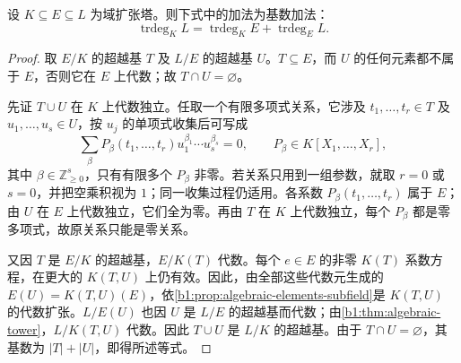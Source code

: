 \begin{proposition}[超越次数的塔式公式]\label{b1:prop:transcendence-tower}
	设 \(K\subseteq E\subseteq L\) 为域扩张塔。则下式中的加法为基数加法：
	\begin{equation}\label{b1:eq:transcendence-tower}
		\operatorname{trdeg}_K L=\operatorname{trdeg}_K E+\operatorname{trdeg}_E L.
	\end{equation}
\end{proposition}
\begin{proof}
	取 \(E/K\) 的超越基 \(T\) 及 \(L/E\) 的超越基 \(U\)。\(T\subseteq E\)，而 \(U\) 的任何元素都不属于 \(E\)，否则它在 \(E\) 上代数；故 \(T\cap U=\varnothing\)。

	先证 \(T\cup U\) 在 \(K\) 上代数独立。任取一个有限多项式关系，它涉及 \(t_1,\ldots,t_r\in T\) 及 \(u_1,\ldots,u_s\in U\)，按 \(u_j\) 的单项式收集后可写成
	\[
		\sum_{\beta}P_\beta(t_1,\ldots,t_r) u_1^{\beta_1}\cdots u_s^{\beta_s}=0, \qquad P_\beta\in K[X_1,\ldots,X_r],
	\]
	其中 \(\beta\in\mathbb Z_{\geq0}^s\)，只有有限多个 \(P_\beta\) 非零。若关系只用到一组参数，就取 \(r=0\) 或 \(s=0\)，并把空乘积视为 \(1\)；同一收集过程仍适用。各系数 \(P_\beta(t_1,\ldots,t_r)\) 属于 \(E\)；由 \(U\) 在 \(E\) 上代数独立，它们全为零。再由 \(T\) 在 \(K\) 上代数独立，每个 \(P_\beta\) 都是零多项式，故原关系只能是零关系。

	又因 \(T\) 是 \(E/K\) 的超越基，\(E/K(T)\) 代数。每个 \(e\in E\) 的非零 \(K(T)\) 系数方程，在更大的 \(K(T,U)\) 上仍有效。因此，由全部这些代数元生成的 \(E(U)=K(T,U)(E)\)，依\cref{b1:prop:algebraic-elements-subfield}是 \(K(T,U)\) 的代数扩张。\(L/E(U)\) 也因 \(U\) 是 \(L/E\) 的超越基而代数；由\cref{b1:thm:algebraic-tower}，\(L/K(T,U)\) 代数。因此 \(T\cup U\) 是 \(L/K\) 的超越基。由于 \(T\cap U=\varnothing\)，其基数为 \(\lvert T\rvert+\lvert U\rvert\)，即得所述等式。
\end{proof}
